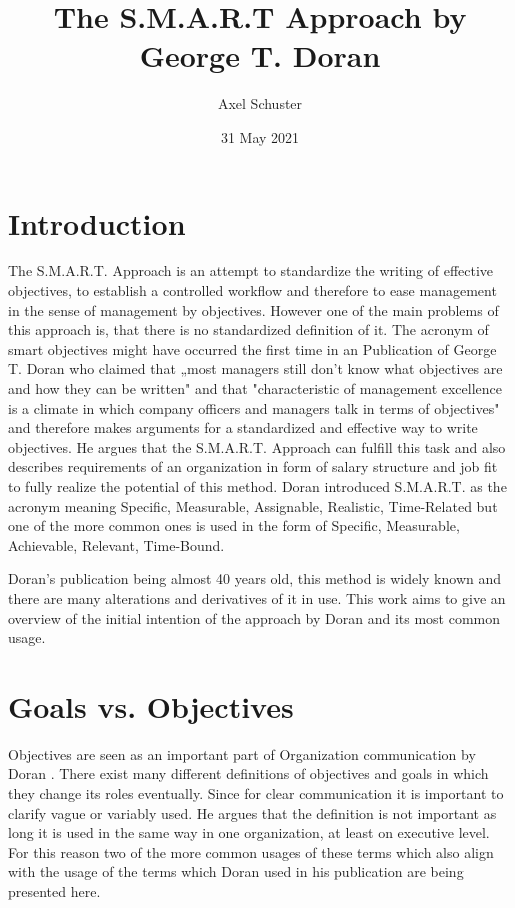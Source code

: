 \documentclass[11pt,a4paper]{article}
\title{The S.M.A.R.T Approach by George T. Doran}
\author{Axel Schuster}
\date{31 May 2021}
\begin{document}
\maketitle
\section{Introduction}
The S.M.A.R.T. Approach \cite{doran1981there, eremit2016smart} is an attempt
to standardize the writing of effective objectives, to establish a controlled
workflow and therefore to ease management in the sense of management by
objectives. However one of the main problems of this approach is, that there
is no standardized definition of it. The acronym of smart objectives might
have occurred the first time in an Publication of George T. Doran
\cite{doran1981there} who claimed that „most managers still don't know what
objectives are and how they can be written" and that "characteristic of
management excellence is a climate in which company officers and managers talk
in terms of objectives" and therefore makes arguments for a standardized and
effective way to write objectives. He argues that the S.M.A.R.T. Approach can
fulfill this task and also describes requirements of an organization in form
of salary structure and job fit to fully realize the potential of this
method. Doran introduced S.M.A.R.T. as the acronym meaning Specific,
Measurable, Assignable, Realistic, Time-Related but one of the more common
ones is used in the form of Specific, Measurable, Achievable, Relevant,
Time-Bound.

Doran's publication being almost 40 years old, this method is widely known and
there are many alterations and derivatives of it in use. This work aims to
give an overview of the initial intention of the approach by Doran and its
most common usage.

\section{Goals vs. Objectives}

Objectives are seen as an important part of Organization communication by
Doran \cite{doran1981there}. There exist many different definitions of
objectives and goals in which they change its roles eventually. Since for
clear communication it is important to clarify vague or variably used. He
argues that the definition is not important as long it is used in the same way
in one organization, at least on executive level. For this reason two of the
more common usages of these terms which also align with the usage of the terms
which Doran used in his publication are being presented here.
\end{document}
